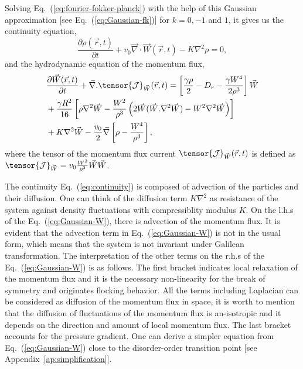 \documentclass[reprint,floatfix,amsmath,amssymb,aps,pre,showkeys,showpacs,superscriptaddress]{revtex4-1}
\newcommand{\grad}{\vec{\nabla}}
\newcommand{\Dif}[2]{\frac{\partial #1}{\partial #2}}
\newcommand{\w}{W}
\newcommand{\vw}{\vec{\w}}
\newcommand{\req}[1]{Eq.~(\ref{#1})}
\begin{document}
Solving \req{eq:fourier-fokker-planck} with the help of this Gaussian approximation [see \req{eq:Gaussian-fk}] for $k=0,-1$ and $1$, it gives us the continuity equation,
\begin{equation}
\Dif{{\rho}(\vec{r},t)}{t} + v_0 \grad \cdot \vw(\vec{r},t) - K \nabla^2 \rho = 0,
\label{eq:continuity}
\end{equation}
and the hydrodynamic equation of the momentum flux,
\begin{equation}
\begin{aligned}
&\Dif{{\vw}(\vec{r},t)}{t} + \grad. \tensor{\mathcal{J}}_{\vw}(\vec{r},t) = \left[ \frac{\gamma \rho}{2} - D_r - \frac{\gamma W^4}{2 \rho^3} \right] \vw \\
&+ \frac{\gamma R^2}{16} \left[ \rho \nabla^2 \vw - \frac{W^2}{\rho^3} \left( 2 \vw (\vw . \nabla^2 \vw) - W^2 \nabla^2 \vw \right) \right] \\
&+ K \nabla^2 \vw - \frac{v_0}{2} \grad \left[  \rho - \frac{W^4}{\rho^3} \right] ,
\end{aligned}
\label{eq:Gaussian-W}
\end{equation}
where the tensor of the momentum flux current $\tensor{\mathcal{J}}_{\vw}(\vec{r},t)$ is defined as $\tensor{\mathcal{J}}_{\vw} = v_0 \frac{W^2}{\rho^3} \vw \vw$.

The continuity \req{eq:continuity} is composed of advection of the particles and their diffusion. One can think of the diffusion term $K \nabla^2$ as resistance of the system against density fluctuations with compressiblity modulus $K$. On the l.h.s of the \req{eq:Gaussian-W}, there is advection of the momentum flux. It is evident that the advection term in \req{eq:Gaussian-W} is not in the usual form, which means that the system is not invariant under Galilean transformation.  The interpretation of the other terms on the r.h.s of the \req{eq:Gaussian-W} is as follows. The first bracket indicates local relaxation of the momentum flux and it is the necessary non-linearity for the  break of symmetry and originates flocking behavior. All the terms including Laplacian can be considered as diffusion of the momentum flux in space, it is worth to mention that the diffusion of fluctuations of the momentum flux is an-isotropic and it depends on the direction and amount of local momentum flux. The last bracket accounts for the pressure gradient. One can derive a simpler equation from \req{eq:Gaussian-W} close to the disorder-order transition point [see Appendix~\ref{ap:simplification}].
\end{document}
